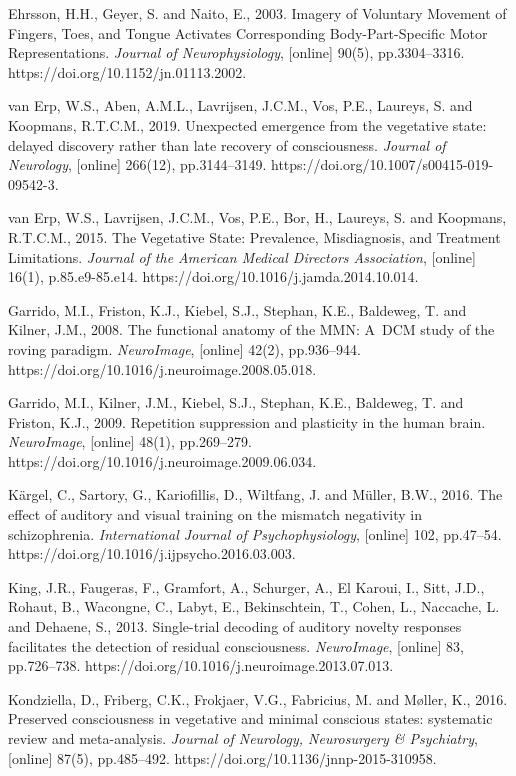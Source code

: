 Ehrsson, H.H., Geyer, S. and Naito, E., 2003. Imagery of Voluntary Movement of Fingers, Toes, and Tongue Activates Corresponding Body-Part-Specific Motor Representations. \textit{Journal of Neurophysiology}, [online] 90(5), pp.3304–3316. https://doi.org/10.1152/jn.01113.2002.

van Erp, W.S., Aben, A.M.L., Lavrijsen, J.C.M., Vos, P.E., Laureys, S. and Koopmans, R.T.C.M., 2019. Unexpected emergence from the vegetative state: delayed discovery rather than late recovery of consciousness. \textit{Journal of Neurology}, [online] 266(12), pp.3144–3149. https://doi.org/10.1007/s00415-019-09542-3.

van Erp, W.S., Lavrijsen, J.C.M., Vos, P.E., Bor, H., Laureys, S. and Koopmans, R.T.C.M., 2015. The Vegetative State: Prevalence, Misdiagnosis, and Treatment Limitations. \textit{Journal of the American Medical Directors Association}, [online] 16(1), p.85.e9-85.e14. https://doi.org/10.1016/j.jamda.2014.10.014.

Garrido, M.I., Friston, K.J., Kiebel, S.J., Stephan, K.E., Baldeweg, T. and Kilner, J.M., 2008. The functional anatomy of the MMN: A~DCM study of the roving paradigm. \textit{NeuroImage}, [online] 42(2), pp.936–944. https://doi.org/10.1016/j.neuroimage.2008.05.018.

Garrido, M.I., Kilner, J.M., Kiebel, S.J., Stephan, K.E., Baldeweg, T. and Friston, K.J., 2009. Repetition suppression and plasticity in the human brain. \textit{NeuroImage}, [online] 48(1), pp.269–279. https://doi.org/10.1016/j.neuroimage.2009.06.034.

Kärgel, C., Sartory, G., Kariofillis, D., Wiltfang, J. and Müller, B.W., 2016. The effect of auditory and visual training on the mismatch negativity in schizophrenia. \textit{International Journal of Psychophysiology}, [online] 102, pp.47–54. https://doi.org/10.1016/j.ijpsycho.2016.03.003.

King, J.R., Faugeras, F., Gramfort, A., Schurger, A., El Karoui, I., Sitt, J.D., Rohaut, B., Wacongne, C., Labyt, E., Bekinschtein, T., Cohen, L., Naccache, L. and Dehaene, S., 2013. Single-trial decoding of auditory novelty responses facilitates the detection of residual consciousness. \textit{NeuroImage}, [online] 83, pp.726–738. https://doi.org/10.1016/j.neuroimage.2013.07.013.

Kondziella, D., Friberg, C.K., Frokjaer, V.G., Fabricius, M. and Møller, K., 2016. Preserved consciousness in vegetative and minimal conscious states: systematic review and meta-analysis. \textit{Journal of Neurology, Neurosurgery \& Psychiatry}, [online] 87(5), pp.485–492. https://doi.org/10.1136/jnnp-2015-310958.

